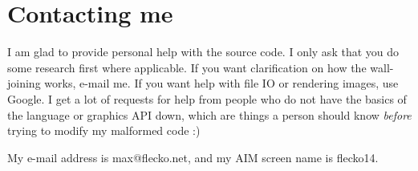 \documentclass [12pt]{article}
\begin{document}
\section{Contacting me}

I am glad to provide personal help with the source code. I only ask that you do some research first where applicable. If you want clarification on how the wall-joining works, e-mail me. If you want help with file IO or rendering images, use Google. I get a lot of requests for help from people who do not have the basics of the language or graphics API down, which are things a person should know \textit{before} trying to modify my malformed code :)

My e-mail address is max@flecko.net, and my AIM screen name is flecko14.
\end{document}
